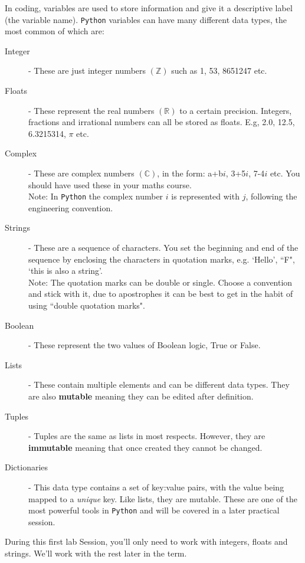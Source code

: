 In coding, variables are used to store information and give it a descriptive label (the variable name). \texttt{Python} variables can have many different data types, the most common of which are:
\begin{description}
\item[Integer] - These are just integer numbers $(\mathbb{Z})$ such as 1, 53, 8651247 etc.
\item[Floats] - These represent the real numbers $(\mathbb{R})$ to a certain precision. Integers, fractions and irrational numbers can all be stored as floats. E.g, 2.0, 12.5, 6.3215314, $\pi$ etc.
\item[Complex] - These are complex numbers $(\mathbb{C})$, in the form: a+b$i$, 3+5$i$, 7-4$i$ etc. You should have used these in your maths course.\\ Note: In \texttt{Python} the complex number $i$ is represented with $j$, following the engineering convention.
\item[Strings] - These are a sequence of characters. You set the beginning and end of the sequence by enclosing the characters in quotation marks, e.g. `Hello', ``F", `this is also a string'.\\ Note: The quotation marks can be double or single. Choose a convention and stick with it, due to apostrophes it can be best to get in the habit of using ``double quotation marks".
\item[Boolean] - These represent the two values of Boolean logic, True or False.
\item[Lists] - These contain multiple elements and can be different data types. They are also \textbf{mutable} meaning they can be edited after definition. 
\item[Tuples] - Tuples are the same as lists in most respects. However, they are \textbf{immutable} meaning that once created they cannot be changed.
\item[Dictionaries] - This data type contains a set of key:value pairs, with the value being mapped to a \textit{unique} key. Like lists, they are mutable. These are one of the most powerful tools in \texttt{Python} and will be covered in a later practical session.
\end{description}

\noindent During this first lab Session, you'll only need to work with integers, floats and strings. We'll work with the rest later in the term.

